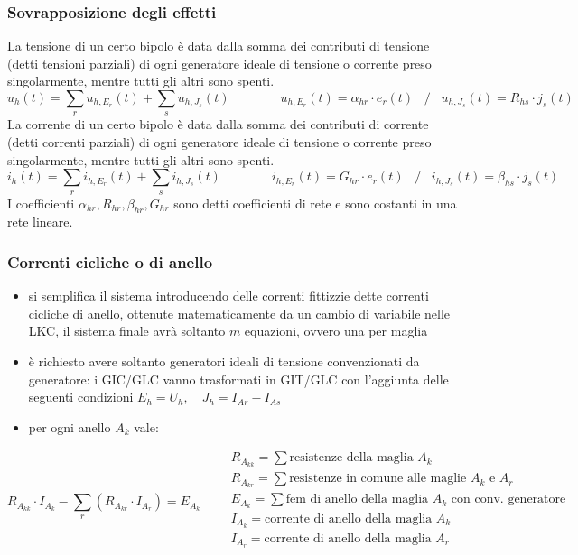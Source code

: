 \documentclass[a4paper]{article}
\begin{document}
\subsubsection*{Sovrapposizione degli effetti}
La tensione di un certo bipolo è data dalla somma dei contributi di tensione (detti tensioni parziali) di ogni generatore ideale
di tensione o corrente preso singolarmente, mentre tutti gli altri sono spenti.
\[u_h(t) = \sum_r u_{h,E_r}(t) + \sum_s u_{h,J_s}(t) \qquad\qquad u_{h,E_r}(t) = \alpha_{hr} \cdot e_r(t) \;\;\; / \;\;\; u_{h,J_s}(t) = R_{hs} \cdot j_s(t)\]
La corrente di un certo bipolo è data dalla somma dei contributi di corrente (detti correnti parziali) di ogni generatore ideale
di tensione o corrente preso singolarmente, mentre tutti gli altri sono spenti.
\[i_h(t) = \sum_r i_{h,E_r}(t) + \sum_s i_{h,J_s}(t) \qquad\qquad i_{h,E_r}(t) = G_{hr} \cdot e_r(t) \;\;\; / \;\;\; i_{h,J_s}(t) = \beta_{hs} \cdot j_s(t) \]
I coefficienti \(\alpha_{hr}, R_{hr}, \beta_{hr}, G_{hr}\) sono detti coefficienti di rete e sono costanti in una rete lineare.

\subsubsection*{Correnti cicliche o di anello}
\begin{itemize}
	\item si semplifica il sistema introducendo delle correnti fittizzie dette correnti cicliche di anello, ottenute matematicamente
	da un cambio di variabile nelle LKC, il sistema finale avrà soltanto \(m\) equazioni, ovvero una per maglia
	\item è richiesto avere soltanto generatori ideali di tensione convenzionati da generatore: i GIC/GLC vanno trasformati
	in GIT/GLC con l'aggiunta delle seguenti condizioni \(E_h = U_h, \quad J_h = I_{Ar} - I_{As}\)
	\item per ogni anello \(A_k\) vale:
\end{itemize}
\[R_{A_{kk}} \cdot I_{A_k} - \sum_r (R_{A_{kr}} \cdot I_{A_r}) = E_{A_k} \qquad
\begin{array}{l}
	R_{A_{kk}} = \sum \text{resistenze della maglia } A_k \\
	R_{A_{kr}} = \sum \text{resistenze in comune alle maglie } A_k \text{ e } A_r \\
	E_{A_k} = \sum \text{fem di anello della maglia } A_k \text{ con conv. generatore} \\
	I_{A_k} = \text{corrente di anello della maglia } A_k \\
	I_{A_r} = \text{corrente di anello della maglia } A_r \\
\end{array}\]
\end{document}
